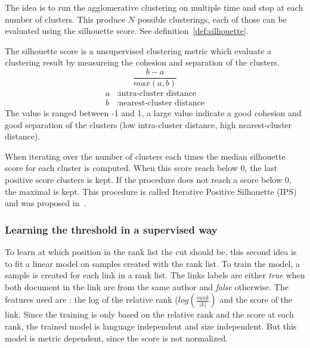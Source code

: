 The idea is to run the agglomerative clustering on multiple time and stop at each number of clusters.
This produce $N$ possible clusterings, each of those can be evaluated using the silhouette score.
See definition~\ref{def:silhouette}.

\begin{definition}
  \label{def:silhouette}
  The silhouette score is a unsupervised clustering metric which evaluate a clustering result by measureing the cohesion and separation of the clusters.
  \begin{equation}
    \frac{b - a}{max(a, b)}
  \end{equation}
  \begin{equation*}
    \begin{split}
      a&: \text{intra-cluster distance}\\
      b&: \text{nearest-cluster distance}
    \end{split}
  \end{equation*}
  The value is ranged between -1 and 1, a large value indicate a good cohesion and good separation of the clusters (low intra-cluster distance, high nearest-cluster distance).
\end{definition}

When iterating over the number of clusters each times the median silhouette score for each cluster is computed.
When this score reach below 0, the last positive score clusters is kept.
If the procedure does not reach a score below 0, the maximal is kept.
This procedure is called Iterative Positive Silhouette (IPS) and was proposed in~\cite{automated_unsupervised}.

\subsubsection{Learning the threshold in a supervised way}

To learn at which position in the rank list the cut should be, this second idea is to fit a linear model on samples created with the rank list.
To train the model, a sample is created for each link in a rank list.
The links labels are either \textit{true} when both document in the link are from the same author and \textit{false} otherwise.
The features used are : the log of the relative rank ($log(\frac{rank}{|L|})$ and the score of the link.
Since the training is only based on the relative rank and the score at each rank, the trained model is language independent and size independent.
But this model is metric dependent, since the score is not normalized.


